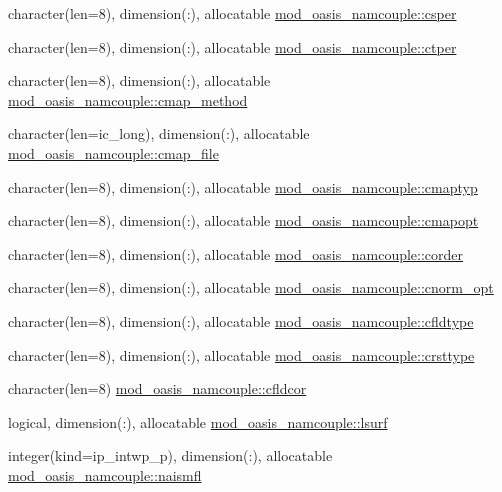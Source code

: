\begin{DoxyCompactItemize}
\item 
character(len=8), dimension(\+:), allocatable \hyperlink{namespacemod__oasis__namcouple_a348612422a03e478041ca5bdfd7201ae}{mod\+\_\+oasis\+\_\+namcouple\+::csper}
\item 
character(len=8), dimension(\+:), allocatable \hyperlink{namespacemod__oasis__namcouple_aa179b0a473551b48ef895497515d021c}{mod\+\_\+oasis\+\_\+namcouple\+::ctper}
\item 
character(len=8), dimension(\+:), allocatable \hyperlink{namespacemod__oasis__namcouple_ac8c1f0014f2c3cbe0cc4fcb09e54dde3}{mod\+\_\+oasis\+\_\+namcouple\+::cmap\+\_\+method}
\item 
character(len=ic\+\_\+long), dimension(\+:), allocatable \hyperlink{namespacemod__oasis__namcouple_a6dbd7bccbfa28b209a4bc58131f8cf11}{mod\+\_\+oasis\+\_\+namcouple\+::cmap\+\_\+file}
\item 
character(len=8), dimension(\+:), allocatable \hyperlink{namespacemod__oasis__namcouple_a82b32aa4c78713443daf65a3dfbc75dc}{mod\+\_\+oasis\+\_\+namcouple\+::cmaptyp}
\item 
character(len=8), dimension(\+:), allocatable \hyperlink{namespacemod__oasis__namcouple_a3d7b34ed13d4ad8f86bbab3ad9956b6b}{mod\+\_\+oasis\+\_\+namcouple\+::cmapopt}
\item 
character(len=8), dimension(\+:), allocatable \hyperlink{namespacemod__oasis__namcouple_a070f65b97986d1075f1deed9224cd89b}{mod\+\_\+oasis\+\_\+namcouple\+::corder}
\item 
character(len=8), dimension(\+:), allocatable \hyperlink{namespacemod__oasis__namcouple_a205e8ba5863c6bf6de5c8450fb060c7a}{mod\+\_\+oasis\+\_\+namcouple\+::cnorm\+\_\+opt}
\item 
character(len=8), dimension(\+:), allocatable \hyperlink{namespacemod__oasis__namcouple_af6d77b87036aa40faa1ae1ed1b2a0866}{mod\+\_\+oasis\+\_\+namcouple\+::cfldtype}
\item 
character(len=8), dimension(\+:), allocatable \hyperlink{namespacemod__oasis__namcouple_a7cbf27327f01748c4f87803ccff71b61}{mod\+\_\+oasis\+\_\+namcouple\+::crsttype}
\item 
character(len=8) \hyperlink{namespacemod__oasis__namcouple_a5e1d0d9b3d9f438102623d9643fbc704}{mod\+\_\+oasis\+\_\+namcouple\+::cfldcor}
\item 
logical, dimension(\+:), allocatable \hyperlink{namespacemod__oasis__namcouple_a902fe007f6c2505858bf72dbc64e43a2}{mod\+\_\+oasis\+\_\+namcouple\+::lsurf}
\item 
integer(kind=ip\+\_\+intwp\+\_\+p), dimension(\+:), allocatable \hyperlink{namespacemod__oasis__namcouple_a4a7cad8814c7811b364fd7d70b60b576}{mod\+\_\+oasis\+\_\+namcouple\+::naismfl}

\end{DoxyCompactItemize}
